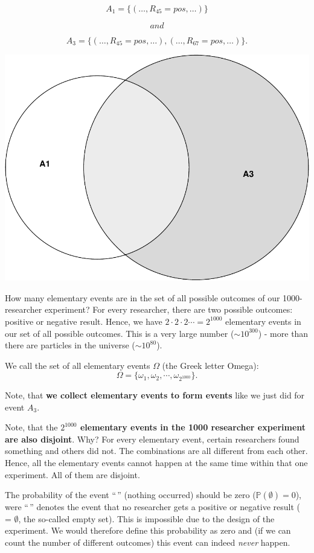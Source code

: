 \documentclass[
]{book}
\newcommand{\pandocbounded}[1]{#1}
\begin{document}
\[A_1 = \{ (\dots ,R_{45} = pos, \dots) \}\]

\[and\]

\[A_3 = \{ (\dots ,R_{45} = pos, \dots), (\dots ,R_{67} = pos, \dots) \}.\]

\pandocbounded{\includegraphics[keepaspectratio]{_main_files/figure-latex/unnamed-chunk-3-1.pdf}}

How many elementary events are in the set of all possible outcomes of our 1000-researcher experiment? For every researcher, there are two possible outcomes: positive or negative result.
Hence, we have \(2 \cdot 2 \cdot 2 \cdots = 2^{1000}\) elementary events in our set of all possible outcomes.
This is a very large number (\(\sim 10^{300}\)) - more than there are particles in the universe (\(\sim 10^{80}\)).

We call the set of all elementary events \(\Omega\) (the Greek letter Omega):
\[\Omega = \{ \omega_1, \omega_2, \cdots, \omega_{2^{1000}} \}.\]

Note, that \textbf{we collect elementary events to form events} like we just did for event \(A_3\).

Note, that the \textbf{\(2^{1000}\) elementary events in the 1000 researcher experiment are also disjoint}. Why? For every elementary event,
certain researchers found something and others did not. The combinations are all different from each other. Hence,
all the elementary events cannot happen at the same time within that one experiment. All of them are disjoint.

The probability of the event ``\,'' (nothing occurred) should be zero (\(\mathbb{P}(\emptyset)=0\)), were ``\,'' denotes
the event that no researcher gets a positive or negative result ( = \(\emptyset\), the so-called empty set).
This is impossible due to the design of the experiment.
We would therefore define this probability as zero and (if we can count the number of different outcomes)
this event can indeed \emph{never} happen.
\end{document}
